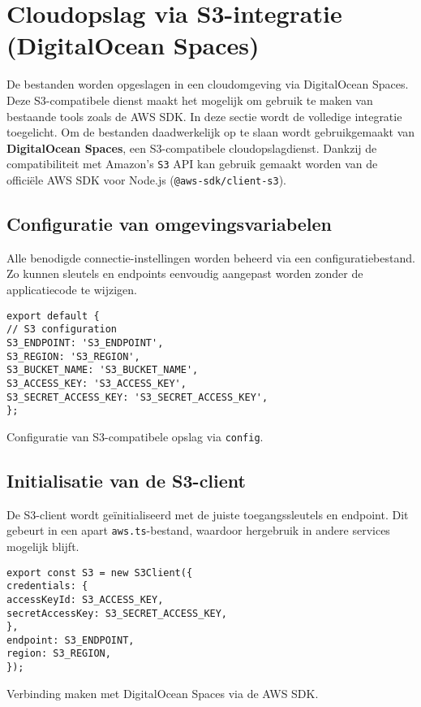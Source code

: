 \section{Cloudopslag via S3-integratie (DigitalOcean Spaces)}
\label{sec:s3-integratie}
De bestanden worden opgeslagen in een cloudomgeving via DigitalOcean Spaces. Deze S3-compatibele dienst maakt het mogelijk om gebruik te maken van bestaande tools zoals de AWS SDK. In deze sectie wordt de volledige integratie toegelicht.
Om de bestanden daadwerkelijk op te slaan wordt gebruikgemaakt van \textbf{DigitalOcean Spaces}, een S3-compatibele cloudopslagdienst. Dankzij de compatibiliteit met Amazon's \texttt{S3} API kan gebruik gemaakt worden van de officiële AWS SDK voor Node.js (\texttt{@aws-sdk/client-s3}).
\subsection{Configuratie van omgevingsvariabelen}
Alle benodigde connectie-instellingen worden beheerd via een configuratiebestand. Zo kunnen sleutels en endpoints eenvoudig aangepast worden zonder de applicatiecode te wijzigen.
\begin{listing}[H]
\begin{verbatim}
export default {
// S3 configuration
S3_ENDPOINT: 'S3_ENDPOINT',
S3_REGION: 'S3_REGION',
S3_BUCKET_NAME: 'S3_BUCKET_NAME',
S3_ACCESS_KEY: 'S3_ACCESS_KEY',
S3_SECRET_ACCESS_KEY: 'S3_SECRET_ACCESS_KEY',
};
\end{verbatim}
\caption[Omgevingsvariabelen voor S3]{Configuratie van S3-compatibele opslag via \texttt{config}.}
\end{listing}
\subsection{Initialisatie van de S3-client}
De S3-client wordt geïnitialiseerd met de juiste toegangssleutels en endpoint. Dit gebeurt in een apart \texttt{aws.ts}-bestand, waardoor hergebruik in andere services mogelijk blijft.
\begin{listing}[H]
\begin{verbatim}
export const S3 = new S3Client({
credentials: {
accessKeyId: S3_ACCESS_KEY,
secretAccessKey: S3_SECRET_ACCESS_KEY,
},
endpoint: S3_ENDPOINT,
region: S3_REGION,
});
\end{verbatim}
\caption[Initialisatie van de S3-client]{Verbinding maken met DigitalOcean Spaces via de AWS SDK.}
\end{listing}
